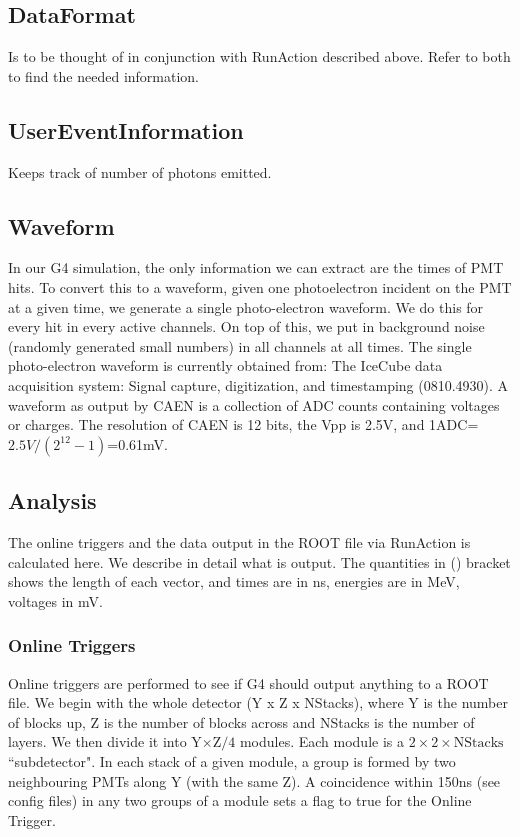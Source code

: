 \documentclass[prd,noshowpacs,nofootinbib,amsmath,amssymb,superscriptaddress]{revtex4}
\begin{document}
\subsection{DataFormat}
Is to be thought of in conjunction with RunAction described above. Refer to both to find the needed information.
\subsection{UserEventInformation}
Keeps track of number of photons emitted.

\subsection{Waveform}
In our G4 simulation, the only information we can extract are the times of PMT hits. To convert this to a waveform, given one photoelectron incident on the PMT at a given time, we generate a single photo-electron waveform. We do this for every hit in every active channels. On top of this, we put in background noise (randomly generated small numbers) in all channels at all times. The single photo-electron waveform is currently obtained from: The IceCube data acquisition system: Signal capture, digitization, and timestamping (0810.4930). A waveform as output by CAEN is a collection of ADC counts containing voltages or charges. The resolution of CAEN is 12 bits, the Vpp is 2.5V, and 1ADC=$2.5V/(2^{12}-1)$=0.61mV.


\subsection{Analysis}
The online triggers and the data output in the ROOT file via RunAction is calculated here. We describe in detail what is output. The quantities in () bracket shows the length of each vector, and times are in ns, energies are in MeV, voltages in mV.
%
%
\subsubsection{Online Triggers}
Online triggers are performed to see if G4 should output anything to a ROOT file. We begin with the whole detector (Y x Z x NStacks), where Y is the number of blocks up, Z is the number of blocks across and NStacks is the number of layers. We then divide it into Y$\times$Z$/4$ modules. Each module is a $2\times2\times\text{NStacks}$ ``subdetector". In each stack of a given module, a group is formed by two neighbouring PMTs along Y (with the same Z). A coincidence within 150ns (see config files) in any two groups of a module sets a flag to true for the Online Trigger. 
%
%
\end{document}
